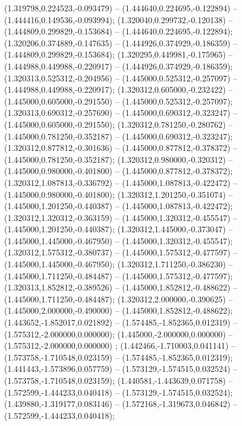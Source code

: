  (1.319798,0.224523,-0.093479) -- (1.444640,0.224695,-0.122894) -- (1.444416,0.149536,-0.093994);
 (1.320040,0.299732,-0.120138) -- (1.444809,0.299829,-0.153684) -- (1.444640,0.224695,-0.122894);
 (1.320206,0.374889,-0.147635) -- (1.444926,0.374929,-0.186359) -- (1.444809,0.299829,-0.153684);
 (1.320295,0.449981,-0.175965) -- (1.444988,0.449988,-0.220917) -- (1.444926,0.374929,-0.186359);
 (1.320313,0.525312,-0.204956) -- (1.445000,0.525312,-0.257097) -- (1.444988,0.449988,-0.220917);
 (1.320312,0.605000,-0.232422) -- (1.445000,0.605000,-0.291550) -- (1.445000,0.525312,-0.257097);
 (1.320313,0.690312,-0.257690) -- (1.445000,0.690312,-0.323247) -- (1.445000,0.605000,-0.291550);
 (1.320312,0.781250,-0.280762) -- (1.445000,0.781250,-0.352187) -- (1.445000,0.690312,-0.323247);
 (1.320312,0.877812,-0.301636) -- (1.445000,0.877812,-0.378372) -- (1.445000,0.781250,-0.352187);
 (1.320312,0.980000,-0.320312) -- (1.445000,0.980000,-0.401800) -- (1.445000,0.877812,-0.378372);
 (1.320312,1.087813,-0.336792) -- (1.445000,1.087813,-0.422472) -- (1.445000,0.980000,-0.401800);
 (1.320312,1.201250,-0.351074) -- (1.445000,1.201250,-0.440387) -- (1.445000,1.087813,-0.422472);
 (1.320312,1.320312,-0.363159) -- (1.445000,1.320312,-0.455547) -- (1.445000,1.201250,-0.440387);
 (1.320312,1.445000,-0.373047) -- (1.445000,1.445000,-0.467950) -- (1.445000,1.320312,-0.455547);
 (1.320312,1.575312,-0.380737) -- (1.445000,1.575312,-0.477597) -- (1.445000,1.445000,-0.467950);
 (1.320312,1.711250,-0.386230) -- (1.445000,1.711250,-0.484487) -- (1.445000,1.575312,-0.477597);
 (1.320313,1.852812,-0.389526) -- (1.445000,1.852812,-0.488622) -- (1.445000,1.711250,-0.484487);
 (1.320312,2.000000,-0.390625) -- (1.445000,2.000000,-0.490000) -- (1.445000,1.852812,-0.488622);
 (1.443652,-1.852017,0.021892) -- (1.574485,-1.852365,0.012319) -- (1.575312,-2.000000,0.000000);
 (1.445000,-2.000000,0.000000) -- (1.575312,-2.000000,0.000000) ;
 (1.442466,-1.710003,0.041141) -- (1.573758,-1.710548,0.023159) -- (1.574485,-1.852365,0.012319);
 (1.441443,-1.573896,0.057759) -- (1.573129,-1.574515,0.032524) -- (1.573758,-1.710548,0.023159);
 (1.440581,-1.443639,0.071758) -- (1.572599,-1.444233,0.040418) -- (1.573129,-1.574515,0.032524);
 (1.439880,-1.319177,0.083146) -- (1.572168,-1.319673,0.046842) -- (1.572599,-1.444233,0.040418);
